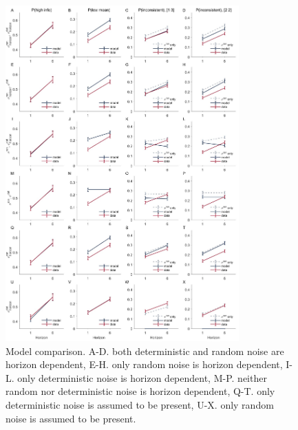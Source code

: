 \documentclass[12pt]{article}
\begin{document}
	\begin{figure}[hp]
		\begin{center}
			\includegraphics[width=0.8\textwidth]{figures/RDBayes_2noise_6modelcomparison.jpg}
			\caption{
			Model comparison. A-D. both deterministic and random noise are horizon dependent, E-H. only random noise is horizon dependent, I-L. only deterministic noise is horizon dependent, M-P. neither random nor deterministic noise is horizon dependent, Q-T. only deterministic noise is assumed to be present, U-X. only random noise is assumed to be present.}
			\label{fig:s10}
		\end{center}
	\end{figure}
\end{document}
